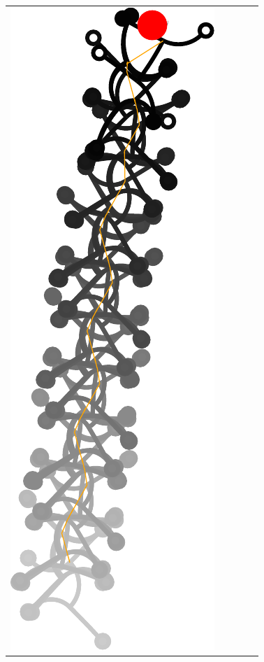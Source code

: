 \documentclass[10pt,a4paper]{article}
\begin{document}
\begin{tabular}{ccccc}
\includegraphics[scale=.8]{pics/pathplanner_without_noise/example_straight/gait.pdf}
&

\end{tabular}
\end{document}
